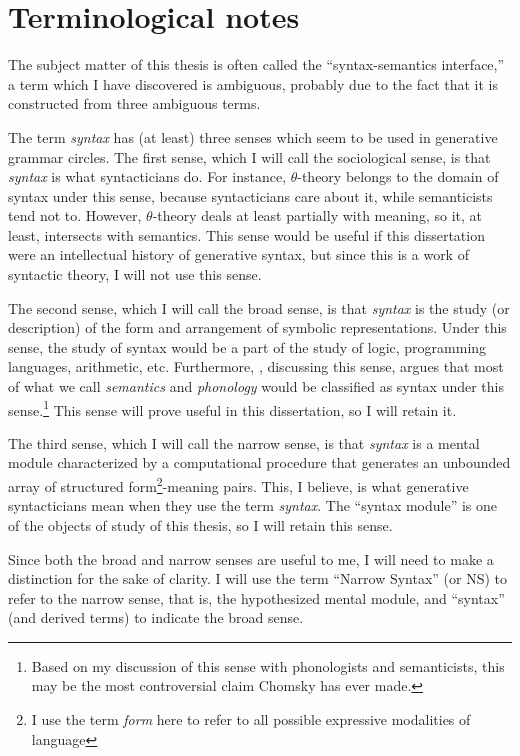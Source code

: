 \documentclass[MilwayThesis]{subfiles}
\begin{document}
\section{Terminological notes}
The subject matter of this thesis is often called the ``syntax-semantics interface,'' a term which I have discovered is ambiguous, probably due to the fact that it is constructed from three ambiguous terms.

The term \textit{syntax} has (at least) three senses which seem to be used in generative grammar circles.
The first sense, which I will call the sociological sense, is that \textit{syntax} is what syntacticians do.
For instance, $\theta$-theory belongs to the domain of syntax under this sense, because syntacticians care about it, while semanticists tend not to.
However, $\theta$-theory deals at least partially with meaning, so it, at least, intersects with semantics.
This sense would be useful if this dissertation were an intellectual history of generative syntax, but since this is a work of syntactic theory, I will not use this sense.

The second sense, which I will call the broad sense, is that \textit{syntax} is the study (or description) of the form and arrangement of symbolic representations.
Under this sense, the study of syntax would be a part of the study of logic, programming languages, arithmetic, etc.
Furthermore, \textcite[174]{chomsky2000new}, discussing this sense, argues that most of what we call \textit{semantics} and \textit{phonology} would be classified as syntax under this sense.\footnote{Based on my discussion of this sense with phonologists and semanticists, this may be the most controversial claim Chomsky has ever made.}
This sense will prove useful in this dissertation, so I will retain it.

The third sense, which I will call the narrow sense, is that \textit{syntax} is a mental module characterized by a computational procedure that generates an unbounded array of structured form\footnote{I use the term \textit{form} here to refer to all possible expressive modalities of language}-meaning pairs.
This, I believe, is what generative syntacticians mean when they use the term \textit{syntax}.
The ``syntax module'' is one of the objects of study of this thesis, so I will retain this sense.

Since both the broad and narrow senses are useful to me, I will need to make a distinction for the sake of clarity.
I will use the term ``Narrow Syntax'' (or NS) to refer to the narrow sense, that is, the hypothesized mental module, and ``syntax'' (and derived terms) to indicate the broad sense.
\end{document}
